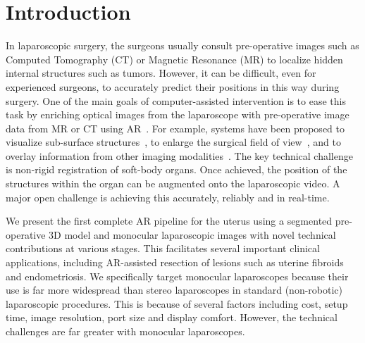 
\section{Introduction}

In laparoscopic surgery, the surgeons usually consult pre-operative images such as Computed Tomography (CT) or Magnetic Resonance (MR) to localize hidden internal structures such as tumors. However, it can be difficult, even for experienced surgeons, to accurately predict their positions in this way during surgery. 
One of the main goals of computer-assisted intervention is to ease this task by enriching optical images from the laparoscope with pre-operative image data from MR or CT using AR~\cite{1732,8714}. 
For example, systems have been proposed to visualize sub-surface structures~\cite{Simpfendrfer2011}, to enlarge the surgical field of view~\cite{Totz2011}, and to overlay information from other imaging modalities~\cite{Nakamoto2008}.
The key technical challenge is non-rigid registration of soft-body organs. Once achieved, the position of the structures within the organ can be augmented onto the laparoscopic video. A major open challenge is achieving this accurately, reliably and in real-time. 

We present the first complete AR pipeline for the uterus using a segmented pre-operative 3D model and monocular laparoscopic images with novel technical contributions at various stages. This facilitates several important clinical applications, including AR-assisted resection of lesions such as uterine fibroids and endometriosis.  We specifically target monocular laparoscopes because their use is far more widespread than stereo laparoscopes in standard (non-robotic) laparoscopic procedures. This is because of several factors including
cost, setup time, image resolution, port size
and display comfort. However, the technical challenges are far greater with monocular laparoscopes. 

